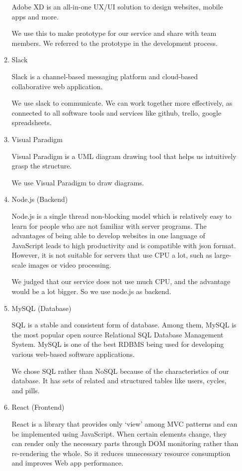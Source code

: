 \documentclass[conference]{IEEEtran}
\begin{document}
\begin{itemize}
\begin{enumerate}
        Adobe XD is an all-in-one UX/UI solution to design websites, mobile apps and more.
        
        We use this to make prototype for our service and share with team members. We referred to the prototype in the development process.
        \item Slack
        
        Slack is a channel-based messaging platform and cloud-based collaborative web application.
        
        We use slack to communicate. We can work together more effectively, as connected to all software tools and services like github, trello, google spreadsheets.
        \item Visual Paradigm
        
        Visual Paradigm is a UML diagram drawing tool that helps us intuitively grasp the structure.
        
        We use Visual Paradigm to draw diagrams.
        \item Node.js (Backend)
        
        Node.js is a single thread non-blocking model which is relatively easy to learn for people who are not familiar with server programs. The advantages of being able to develop websites in one language of JavaScript leads to high productivity and is compatible with json format. However, it is not suitable for servers that use CPU a lot, such as large-scale images or video processing. 
        
        We judged that our service does not use much CPU, and the advantage would be a lot bigger. So we use node.js as backend.
        \item MySQL (Database)
        
        SQL is a stable and consistent form of database. Among them, MySQL is the most popular open source Relational SQL Database Management System. MySQL is one of the best RDBMS being used for developing various web-based software applications.
        
        We chose SQL rather than NoSQL because of the characteristics of our database. It has sets of related and structured tables like users, cycles, and pills.
        \item React (Frontend)
        
        React is a library that provides only ‘view’ among MVC patterns and can be implemented using JavaScript. When certain elements change, they can render only the necessary parts through DOM monitoring rather than re-rendering the whole. So it reduces unnecessary resource consumption and improves Web app performance.
        

\end{enumerate}
\end{itemize}
\end{document}
